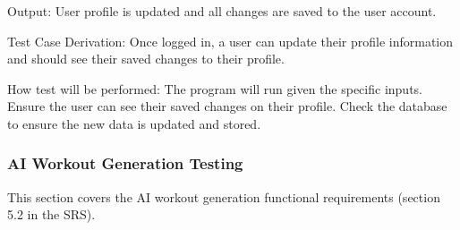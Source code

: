 \documentclass[12pt, titlepage]{article}
\begin{document}
\begin{enumerate}
        Output: User profile is updated and all changes are saved to the user account.

        Test Case Derivation: Once logged in, a user can update their profile information and should see their saved changes to their profile.

        How test will be performed: The program will run given the specific inputs. Ensure the user can see their saved changes on their profile. Check the database to ensure the new data is updated and stored.

    \end{enumerate}

    \subsubsection{AI Workout Generation Testing}
    This section covers the AI workout generation functional requirements (section 5.2 in the SRS).
\end{document}
